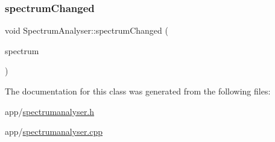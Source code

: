 \hypertarget{class_spectrum_analyser_af2dd8d387193fa6743ac15d3f8163ee0}{}\label{class_spectrum_analyser_af2dd8d387193fa6743ac15d3f8163ee0} 
\subsubsection{\texorpdfstring{spectrum\+Changed}{spectrumChanged}}
{\footnotesize\ttfamily void Spectrum\+Analyser\+::spectrum\+Changed (\begin{DoxyParamCaption}\item[{const \hyperlink{class_frequency_spectrum}{Frequency\+Spectrum} \&}]{spectrum }\end{DoxyParamCaption})\hspace{0.3cm}{\ttfamily [signal]}}



The documentation for this class was generated from the following files\+:\begin{DoxyCompactItemize}
\item 
app/\hyperlink{spectrumanalyser_8h}{spectrumanalyser.\+h}\item 
app/\hyperlink{spectrumanalyser_8cpp}{spectrumanalyser.\+cpp}\end{DoxyCompactItemize}
